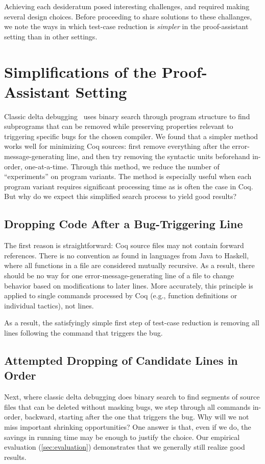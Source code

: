 \documentclass[a4paper,USenglish,cleveref,autoref,thm-restate]{lipics-v2021}
\begin{document}
Achieving each desideratum posed interesting challenges, and required making several design choices.
Before proceeding to share solutions to these challanges, we note the ways in which test-case reduction is \emph{simpler} in the proof-assistant setting than in other settings.


\section{Simplifications of the Proof-Assistant Setting}\label{sec:easier}

Classic delta debugging~\cite{Zeller2002} uses binary search through program structure to find subprograms that can be removed while preserving properties relevant to triggering specific bugs for the chosen compiler.
We found that a simpler method works well for minimizing Coq sources: first remove everything after the error-message-generating line, and then try removing the syntactic units beforehand in-order, one-at-a-time.
Through this method, we reduce the number of ``experiments'' on program variants.
The method is especially useful when each program variant requires significant processing time as is often the case in Coq.
But why do we expect this simplified search process to yield good results?

\subsection{Dropping Code After a Bug-Triggering Line}

The first reason is straightforward: Coq source files may not contain forward references.
There is no convention as found in languages from Java to Haskell, where all functions in a file are considered mutually recursive.
As a result, there should be no way for one error-message-generating line of a file to change behavior based on modifications to later lines.
More accurately, this principle is applied to single commands processed by Coq (e.g., function definitions or individual tactics), not lines.

As a result, the satisfyingly simple first step of test-case reduction is removing all lines following the command that triggers the bug.

\subsection{Attempted Dropping of Candidate Lines in Order}

Next, where classic delta debugging does binary search to find segments of source files that can be deleted without masking bugs, we step through all commands in-order, backward, starting after the one that triggers the bug.
Why will we not miss important shrinking opportunities?
One answer is that, even if we do, the savings in running time may be enough to justify the choice.
Our empirical evaluation (\autoref{sec:evaluation}) demonstrates that we generally still realize good results.
\end{document}
